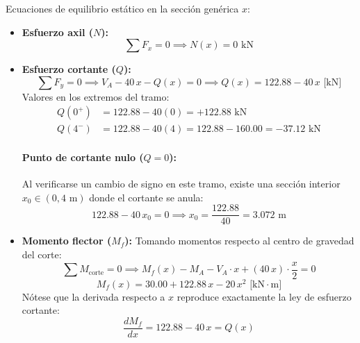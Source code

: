 Ecuaciones de equilibrio estático en la sección genérica $x$:
\begin{itemize}
    \item \textbf{Esfuerzo axil ($N$):}
          \begin{equation}
              \sum F_x = 0 \implies \boxed{N(x) = 0\text{ kN}}
          \end{equation}

    \item \textbf{Esfuerzo cortante ($Q$):}
          \begin{equation}
              \sum F_y = 0 \implies V_A - 40\,x - Q(x) = 0 \implies \boxed{Q(x) = 122.88 - 40\,x\text{ [kN]}}
          \end{equation}
          Valores en los extremos del tramo:
          \begin{align*}
              Q(0^+) & = 122.88 - 40(0) = \boxed{+122.88\text{ kN}}                  \\
              Q(4^-) & = 122.88 - 40(4) = 122.88 - 160.00 = \boxed{-37.12\text{ kN}}
          \end{align*}

          \paragraph{Punto de cortante nulo ($Q = 0$):}
          Al verificarse un cambio de signo en este tramo, existe una sección interior $x_0 \in (0, 4\text{ m})$ donde el cortante se anula:
          \begin{equation}
              122.88 - 40\,x_0 = 0 \implies \boxed{x_0 = \frac{122.88}{40} = 3.072\text{ m}}
          \end{equation}

    \item \textbf{Momento flector ($M_f$):}
          Tomando momentos respecto al centro de gravedad del corte:
          \begin{equation}
              \sum M_{\text{corte}} = 0 \implies M_f(x) - M_A - V_A \cdot x + (40\,x)\cdot\frac{x}{2} = 0
          \end{equation}
          \begin{equation}
              \boxed{M_f(x) = 30.00 + 122.88\,x - 20\,x^2\text{ [kN}\cdot\text{m]}}
          \end{equation}
          Nótese que la derivada respecto a $x$ reproduce exactamente la ley de esfuerzo cortante:
          \begin{equation}
              \frac{dM_f}{dx} = 122.88 - 40\,x = Q(x)
          \end{equation}


\end{itemize}
